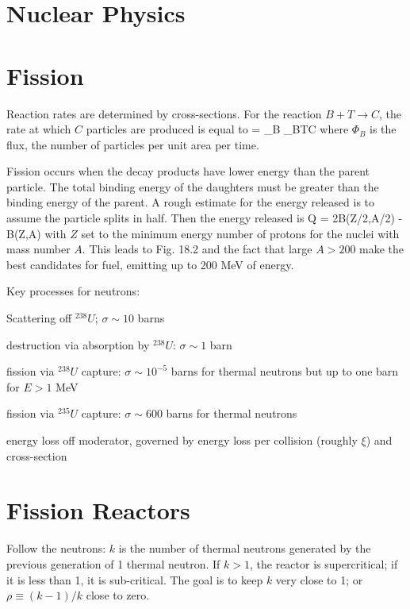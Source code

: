 \documentclass[11pt]{book}
\begin{document}
\section{Nuclear Physics}

\section{Fission}

Reaction rates are determined by cross-sections. For the reaction $B+T\rightarrow C$, the rate at which $C$ particles are produced is equal to
\be
{} = \Phi_B \sigma_{BT\rightarrow C} \ee
where $\Phi_B$ is the flux, the number of particles per unit area per time. 

Fission occurs when the decay products have lower energy than the parent particle. The total binding energy of the daughters must be greater than the binding energy of the parent. A rough estimate for the energy released is to assume the particle splits in half. Then the energy released is
\be
Q = 2B(Z/2,A/2) - B(Z,A)
\ee
with $Z$ set to the minimum energy number of protons for the nuclei with mass number $A$. This leads to Fig. 18.2 and the fact that large $A>200$ make the best candidates for fuel, emitting up to 200 MeV of energy.

Key processes for neutrons:
\bei
\item Scattering off $^{238}U$; $\sigma\sim 10$ barns
\item destruction via absorption by $^{238}U$: $\sigma\sim 1$ barn
\item fission via $^{238}U$ capture: $\sigma\sim 10^{-5}$ barns for thermal neutrons but up to one barn for $E>1$ MeV
\item fission via $^{235}U$ capture: $\sigma\sim600$ barns for thermal neutrons
\item energy loss off moderator, governed by energy loss per collision (roughly $\xi$) and cross-section
\eei



\section{Fission Reactors}

Follow the neutrons: $k$ is the number of thermal neutrons generated by the previous generation of 1 thermal neutron. If $k>1$, the reactor is supercritical; if it is less than 1, it is sub-critical. The goal is to keep $k$ very close to 1; or $\rho\equiv (k-1)/k$ close to zero.
\end{document}

